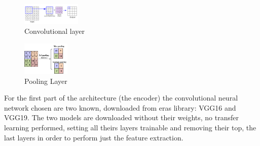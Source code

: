 \documentclass{article}
\begin{document}
\begin{multicols}{2}
    \begin{figure}[H]
        \begin{center}
        \includegraphics[width=0.25\textwidth]{img/convLayer.png}
        \caption{Convolutional layer}
        \label{fig:convL}
    \end{center}
\end{figure}
    \columnbreak
    \begin{figure}[H]
        \begin{center}
        \includegraphics[width=0.2\textwidth]{img/poolingLayer.png}
        \caption{Pooling Layer}
        \label{fig:poolL}
    \end{center}
\end{figure}
\end{multicols}
For the first part of the architecture (the encoder) the convolutional neural network chosen are two known, downloaded from eras library: VGG16 and VGG19. The two models are downloaded without their weights, no transfer learning performed, setting all theirs layers trainable and removing their top, the last layers in order to perform just the feature extraction.
\end{document}
